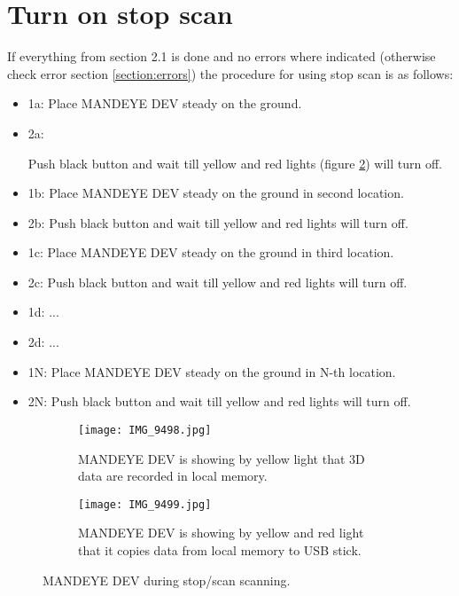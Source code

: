 \pagebreak
\section{Turn on stop scan}
If everything from section 2.1 is done and no errors where indicated (otherwise check error section \ref{section:errors}) the procedure for using stop scan is as follows:
\begin{itemize}
	\item 1a: Place MANDEYE DEV steady on the ground.
	\item 2a: \begin{minipage}[t]{0.75\linewidth}
		\raggedright
		\medskip	
	\end{minipage}
	\linebreak
	Push black button and wait till yellow and red lights (figure \ref{fig:m42}) will turn off.
	\item 1b: Place MANDEYE DEV steady on the ground in second location.
	\item 2b: Push black button and wait till yellow and red lights will turn off.
	\item 1c: Place MANDEYE DEV steady on the ground in third location.
	\item 2c: Push black button and wait till yellow and red lights will turn off.
	\item 1d: ...
	\item 2d: ...
	\item 1N: Place MANDEYE DEV steady on the ground in N-th location.
	\item 2N: Push black button and wait till yellow and red lights will turn off.
\end{itemize}
\begin{figure}[H]
	\centering
	\begin{subfigure}[b]{0.45\textwidth}
		\centering
		\texttt{[image: IMG\_9498.jpg]}
		\caption{MANDEYE DEV is showing by yellow light that 3D data are recorded in local memory.}
		\label{fig:m41}
	\end{subfigure}
	\hfill
	\begin{subfigure}[b]{0.45\textwidth}
		\centering
		\texttt{[image: IMG\_9499.jpg]}
		\caption{MANDEYE DEV is showing by yellow and red light that it copies data from local memory to USB stick.}
		\label{fig:m42}
	\end{subfigure}
	\caption{MANDEYE DEV during stop/scan scanning.}
	\label{fig:mandeye_hardware4}
\end{figure}

